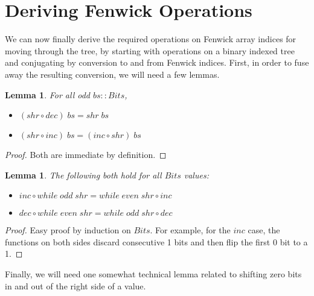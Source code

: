 \documentclass{jfp}
\newcommand{\Conid}[1]{\mathit{#1}}
\newcommand{\Varid}[1]{\mathit{#1}}
\newtheorem{lem}[thm]{Lemma}
\theoremstyle{definition}
\theoremstyle{remark}
\begin{document}
\section{Deriving Fenwick Operations} \label{sec:fenwick-ops}

We can now finally derive the required operations on Fenwick array
indices for moving through the tree, by starting with operations on a
binary indexed tree and conjugating by conversion to and from Fenwick
indices.  First, in order to fuse away the resulting conversion, we
will need a few lemmas.

\begin{lem} \label{lem:incshr}
  For all odd \ensuremath{\Varid{bs}\mathbin{::}\Conid{Bits}},
  \begin{itemize}
  \item \ensuremath{(\Varid{shr}\mathbin{\circ}\Varid{dec})\;\Varid{bs}\mathrel{=}\Varid{shr}\;\Varid{bs}}
  \item \ensuremath{(\Varid{shr}\mathbin{\circ}\Varid{inc})\;\Varid{bs}\mathrel{=}(\Varid{inc}\mathbin{\circ}\Varid{shr})\;\Varid{bs}}
  \end{itemize}
\end{lem}
\begin{proof}
  Both are immediate by definition.
\end{proof}

\begin{lem} \label{lem:incwhile}
  The following both hold for all \ensuremath{\Conid{Bits}} values:
  \begin{itemize}
  \item \ensuremath{\Varid{inc}\mathbin{\circ}\Varid{while}\;\Varid{odd}\;\Varid{shr}\mathrel{=}\Varid{while}\;\Varid{even}\;\Varid{shr}\mathbin{\circ}\Varid{inc}}
  \item \ensuremath{\Varid{dec}\mathbin{\circ}\Varid{while}\;\Varid{even}\;\Varid{shr}\mathrel{=}\Varid{while}\;\Varid{odd}\;\Varid{shr}\mathbin{\circ}\Varid{dec}}
  \end{itemize}
\end{lem}
\begin{proof}
  Easy proof by induction on \ensuremath{\Conid{Bits}}.  For example, for the \ensuremath{\Varid{inc}} case,
  the functions on both sides discard consecutive 1 bits and then flip
  the first 0 bit to a 1.
\end{proof}

Finally, we will need one somewhat technical lemma related to shifting
zero bits in and out of the right side of a value.
\end{document}
